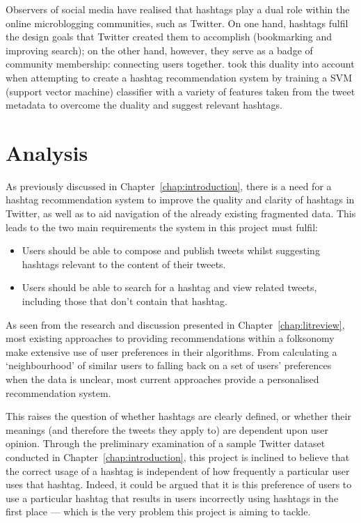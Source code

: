 \documentclass[11pt,a4paper]{report}
\begin{document}
Observers of social media have realised that hashtags play a dual role within the online microblogging communities, such as Twitter. On one hand, hashtags fulfil the design goals that Twitter created them to accomplish (bookmarking and improving search); on the other hand, however, they serve as a badge of community membership: connecting users together. \textcite{Yang:2012} took this duality into account when attempting to create a hashtag recommendation system by training a SVM (support vector machine) classifier with a variety of features taken from the tweet metadata to overcome the duality and suggest relevant hashtags.

\pagebreak

\chapter{Analysis}
\label{chap:analysis}

As previously discussed in Chapter~\ref{chap:introduction}, there is a need for a hashtag recommendation system to improve the quality and clarity of hashtags in Twitter, as well as to aid navigation of the already existing fragmented data. This leads to the two main requirements the system in this project must fulfil:
\begin{itemize}
    \item Users should be able to compose and publish tweets whilst suggesting hashtags relevant to the content of their tweets.
    \item Users should be able to search for a hashtag and view related tweets, including those that don't contain that hashtag.
\end{itemize}

As seen from the research and discussion presented in Chapter~\ref{chap:litreview}, most existing approaches to providing recommendations within a folksonomy make extensive use of user preferences in their algorithms. From calculating a `neighbourhood' of similar users to falling back on a set of users' preferences when the data is unclear, most current approaches provide a personalised recommendation system.

This raises the question of whether hashtags are clearly defined, or whether their meanings (and therefore the tweets they apply to) are dependent upon user opinion. Through the preliminary examination of a sample Twitter dataset conducted in Chapter~\ref{chap:introduction}, this project is inclined to believe that the correct usage of a hashtag is independent of how frequently a particular user uses that hashtag. Indeed, it could be argued that it is this preference of users to use a particular hashtag that results in users incorrectly using hashtags in the first place --- which is the very problem this project is aiming to tackle.
\end{document}
